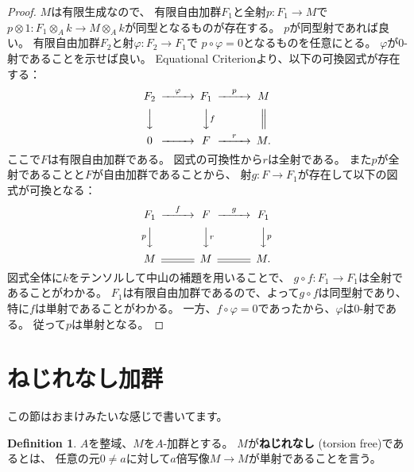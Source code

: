 \documentclass[uplatex]{jsarticle}
\theoremstyle{definition}
\newtheorem{defi}[defi]{Definition}
\theoremstyle{plain}
\begin{document}
\begin{proof}
  \(M\)は有限生成なので、
  有限自由加群\(F_1\)と全射\(p:F_1\to M\)で
  \(p\otimes 1:F_1\otimes_Ak \to M\otimes_Ak\)が同型となるものが存在する。
  \(p\)が同型射であれば良い。
  有限自由加群\(F_2\)と射\(\varphi:F_2\to F_1\)で
  \(p\circ \varphi = 0\)となるものを任意にとる。
  \(\varphi\)が\(0\)-射であることを示せば良い。
  Equational Criterionより、以下の可換図式が存在する：
  \[
  \begin{CD}
    F_2 @>\varphi>> F_1 @>p>> M \\
    @VVV @VVfV @| \\
    0 @>>> F @>r>> M.
  \end{CD}
  \]
  ここで\(F\)は有限自由加群である。
  図式の可換性から\(r\)は全射である。
  また\(p\)が全射であることと\(F\)が自由加群であることから、
  射\(g:F\to F_1\)が存在して以下の図式が可換となる：
  \[
  \begin{CD}
    F_1 @>f>> F @>g>> F_1 \\
    @VpVV @VVrV @VVpV \\
    M @= M @= M.
  \end{CD}
  \]
  図式全体に\(k\)をテンソルして中山の補題を用いることで、
  \(g\circ f:F_1\to F_1\)は全射であることがわかる。
  \(F_1\)は有限自由加群であるので、よって\(g\circ f\)は同型射であり、
  特に\(f\)は単射であることがわかる。
  一方、\(f\circ \varphi = 0\)であったから、\(\varphi\)は\(0\)-射である。
  従って\(p\)は単射となる。
\end{proof}





\section{ねじれなし加群}

この節はおまけみたいな感じで書いてます。


\begin{defi}
  \(A\)を整域、\(M\)を\(A\)-加群とする。
  \(M\)が\textbf{ねじれなし} (torsion free)であるとは、
  任意の元\(0\neq a\)に対して\(a\)倍写像\(M\to M\)が単射であることを言う。
\end{defi}
\end{document}
